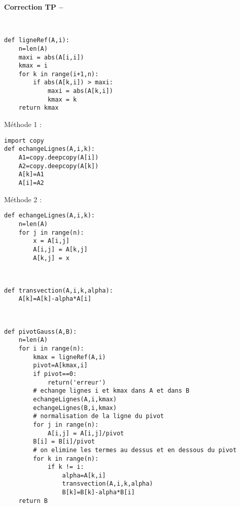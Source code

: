 \ifdef{\public}{}{}

\newpage 

\begin{center}
{\Large\bf Correction TP \no {\num} -- \descrip}
\end{center}

\begin{solution}~\\
\vspace*{-0.7cm}
\begin{verbatim}
def ligneRef(A,i):
    n=len(A)
    maxi = abs(A[i,i])
    kmax = i
    for k in range(i+1,n):
        if abs(A[k,i]) > maxi:
            maxi = abs(A[k,i])
            kmax = k
    return kmax
\end{verbatim}
\end{solution}


\begin{solution}
Méthode 1 :
\begin{verbatim}
import copy
def echangeLignes(A,i,k):
    A1=copy.deepcopy(A[i])
    A2=copy.deepcopy(A[k])
    A[k]=A1
    A[i]=A2
\end{verbatim}
Méthode 2 :
\begin{verbatim}
def echangeLignes(A,i,k):
    n=len(A)
    for j in range(n):
        x = A[i,j]
        A[i,j] = A[k,j]
        A[k,j] = x
\end{verbatim}
\end{solution}

\begin{solution}~\\
\vspace*{-0.7cm}
\begin{verbatim}
def transvection(A,i,k,alpha):
    A[k]=A[k]-alpha*A[i] 
\end{verbatim}
\end{solution}


\begin{solution}~\\
\vspace*{-0.7cm}
\begin{verbatim}
def pivotGauss(A,B):
    n=len(A)
    for i in range(n):
        kmax = ligneRef(A,i)
        pivot=A[kmax,i]   
        if pivot==0:
            return('erreur')
        # echange lignes i et kmax dans A et dans B
        echangeLignes(A,i,kmax)
        echangeLignes(B,i,kmax)
        # normalisation de la ligne du pivot
        for j in range(n):
            A[i,j] = A[i,j]/pivot   
        B[i] = B[i]/pivot
        # on elimine les termes au dessus et en dessous du pivot
        for k in range(n):
            if k != i:
                alpha=A[k,i]
                transvection(A,i,k,alpha)  
                B[k]=B[k]-alpha*B[i]       
    return B
\end{verbatim}
\end{solution}

